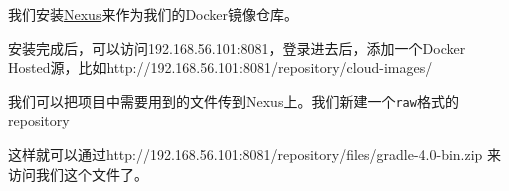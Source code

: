 \documentclass[12pt]{article}
\begin{document}
\makeblogtitle

我们安装\href{https://store.docker.com/community/images/sonatype/nexus3}{Nexus}来作为我们的Docker镜像仓库。

\begin{Shaded}
\begin{Highlighting}[]
 
 \DataTypeTok{\textbackslash{}}
    \DataTypeTok{\textbackslash{}}
    \DataTypeTok{\textbackslash{}}
    \DataTypeTok{\textbackslash{}}
\end{Highlighting}
\end{Shaded}

安装完成后，可以访问192.168.56.101:8081，登录进去后，添加一个Docker Hosted源，比如http://192.168.56.101:8081/repository/cloud-images/

我们可以把项目中需要用到的文件传到Nexus上。我们新建一个\texttt{raw}格式的repository

\begin{Shaded}
\begin{Highlighting}[]
  
\end{Highlighting}
\end{Shaded}

这样就可以通过http://192.168.56.101:8081/repository/files/gradle-4.0-bin.zip 来访问我们这个文件了。
\end{document}
